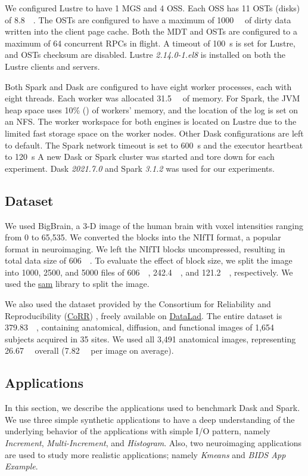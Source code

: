 \documentclass[conference]{IEEEtran}
\begin{document}
We configured Lustre to have 1 MGS and 4 OSS.
Each OSS has 11 OSTs (disks) of \SI{8.8}{\tebi\byte}.
The OSTs are configured to have a maximum of \SI{1000}{\mebi\byte} of dirty data written into the client page cache.
Both the MDT and OSTs are configured to a maximum of 64 concurrent RPCs in flight.
A timeout of \SI{100}{\second} is set for Lustre, and OSTs checksum are disabled.
Lustre \textit{2.14.0-1.el8} is installed on both the Lustre clients and servers.
	
Both Spark and Dask are configured to have eight worker processes, each with eight threads.
Each worker was allocated \SI{31.5}{\gibi\byte} of memory.
For Spark, the JVM heap space uses 10\% () of workers' memory, and the location of the log is set on an NFS.
The worker workspace for both engines is located on Lustre due to the limited fast storage space on the worker nodes.
Other Dask configurations are left to default.
The Spark network timeout is set to \SI{600}{\second} and the executor heartbeat to \SI{120}{\second}
A new Dask or Spark cluster was started and tore down for each experiment.
Dask \textit{2021.7.0} and Spark \textit{3.1.2} was used for our experiments.
	
\subsection{Dataset}
We used BigBrain\cite{Amunts:13}, a 3-D image of the human brain with voxel
intensities ranging from 0 to 65,535. We converted the blocks into the
NIfTI format, a popular format in neuroimaging. We left the NIfTI blocks
uncompressed, resulting in total data size of \SI{606}{\gibi\byte}. To
evaluate the effect of block size, we split the image into 1000, 2500,
and 5000 files of \SI{606}{\mebi\byte}, \SI{242.4}{\mebi\byte}, and
\SI{121.2}{\mebi\byte}, respectively.
We used the \href{https://github.com/big-data-lab-team/sam}{sam} library to split the image.
		
We also used the dataset provided by the Consortium for Reliability and
Reproducibility
(\href{http://fcon_1000.projects.nitrc.org/indi/CoRR/html/}{CoRR})
\cite{zuo2014open}, freely available on
\href{https://datasets.datalad.org/?dir=/corr/RawDataBIDS}{DataLad}.
The entire dataset is \SI{379.83}{\gibi\byte}, containing anatomical, diffusion,
and functional images of 1,654 subjects acquired in 35 sites.
We used all 3,491 anatomical images, representing \SI{26.67}{\gibi\byte} overall
(\SI{7.82}{\mebi\byte} per image on average).
		
\subsection{Applications}
In this section, we describe the applications used to benchmark Dask and Spark.
We use three simple synthetic applications to have a deep understanding of the 
underlying behavior of the applications with simple I/O pattern, namely
\textit{Increment}, \textit{Multi-Increment}, and \textit{Histogram}.
Also, two neuroimaging applications are used to study more realistic 
applications; namely \textit{Kmeans} and \textit{BIDS App Example}.
		
\end{document}
